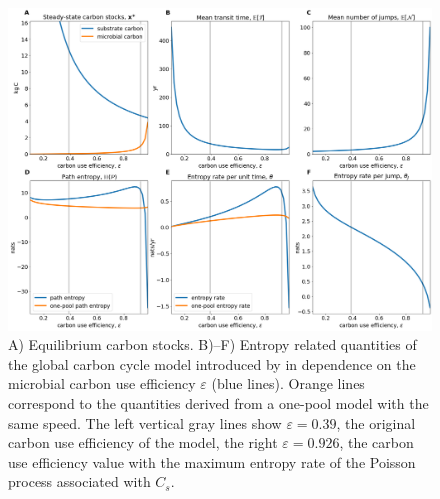 \documentclass[smallextended]{svjour3}
\begin{document}
\begin{figure}[htbp]
    \centering
    \includegraphics[width=1.0\linewidth]{figs/Wang_entropies.png}
    \caption{A) Equilibrium carbon stocks.
    B)--F) Entropy related quantities of the global carbon cycle model introduced by \citet{Wang2014BG} in dependence on the microbial carbon use efficiency $\varepsilon$ (blue lines).
    Orange lines correspond to the quantities derived from a one-pool model with the same speed.
    The left vertical gray lines show $\varepsilon=0.39$, the original carbon use efficiency of the model, the right $\varepsilon=0.926$, the carbon use efficiency value with the maximum entropy rate of the Poisson process associated with $C_s$.}
    \label{fig:Wang_entropies}
\end{figure}
\end{document}

